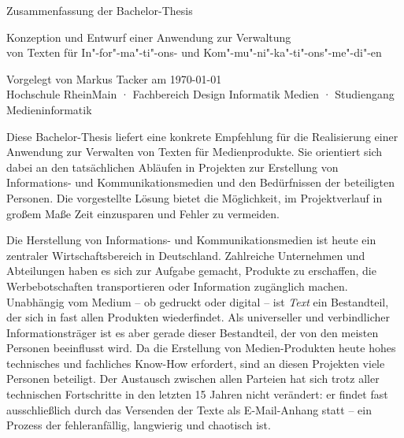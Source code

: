 \documentclass[11pt,a4paper]{article}
\begin{document}
\setmainfont[Mapping=tex-text]{Museo Sans}

\begin{center}
Zusammenfassung der Bachelor-Thesis\\
\begin{large}
Konzeption und Entwurf einer Anwendung zur Verwaltung\\von Texten für In"-for"-ma"-ti"-ons- und Kom"-mu"-ni"-ka"-ti"-ons"-me"-di"-en\\
\end{large}
\bigskip
\begin{tiny}
Vorgelegt von Markus Tacker am \today\\
Hochschule RheinMain · Fachbereich Design Informatik Medien · Studiengang Medieninformatik\\
\end{tiny}
\end{center}

\setmainfont[Mapping=tex-text,BoldFont={Vollkorn-Bold},ItalicFont={Vollkorn-Italic},BoldItalicFont={Vollkorn-Bold Italic}]{Vollkorn}
\setsansfont[Mapping=tex-text]{Museo Sans}

Diese Bachelor-Thesis liefert eine konkrete Empfehlung für die Realisierung einer Anwendung zur Verwalten von Texten für Medienprodukte. Sie orientiert sich dabei an den tatsächlichen Abläufen in Projekten zur Erstellung von Informations- und Kommunikationsmedien und den Bedürfnissen der beteiligten Personen. Die vorgestellte Lösung bietet die Möglichkeit, im Projektverlauf in großem Maße Zeit einzusparen und Fehler zu vermeiden.

\secbar

Die Herstellung von Informations- und Kommunikationsmedien ist heute ein zentraler Wirtschaftsbereich in Deutschland. Zahlreiche Unternehmen und Abteilungen haben es sich zur Aufgabe gemacht, Produkte zu erschaffen, die Werbebotschaften transportieren oder Information zugänglich machen. Unabhängig vom Medium -- ob gedruckt oder digital -- ist \emph{Text} ein Bestandteil, der sich in fast allen Produkten wiederfindet. Als universeller und verbindlicher Informationsträger ist es aber gerade dieser Bestandteil, der von den meisten Personen beeinflusst wird. Da die Erstellung von Medien-Produkten heute hohes technisches und fachliches Know-How erfordert, sind an diesen Projekten viele Personen beteiligt. Der Austausch zwischen allen Parteien hat sich trotz aller technischen Fortschritte in den letzten 15 Jahren nicht verändert: er findet fast ausschließlich durch das Versenden der Texte als E-Mail-Anhang statt -- ein Prozess der fehleranfällig, langwierig und chaotisch ist. 
\end{document}
